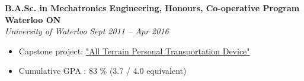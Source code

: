     \textbf{B.A.Sc. in Mechatronics Engineering, Honours, Co-operative Program}
    \hfill
    \textbf{Waterloo ON}\\
    \textit{University of Waterloo}
    \hfill
    \textit{Sept 2011 -- Apr 2016}
    \begin{itemize}
        \item Capstone project: \href{https://youtu.be/OwfrKlr_Zhk}{"All Terrain Personal Transportation Device"}
        \item Cumulative GPA : 83 \% (3.7 / 4.0 equivalent)
    \end{itemize}
